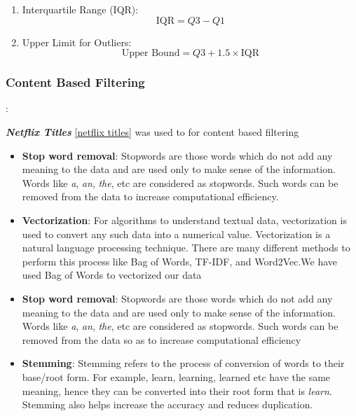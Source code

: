 \documentclass[a4paper,10pt]{article}
\begin{document}
\begin{enumerate}
  \item Interquartile Range (IQR):
    \[ \text{IQR} = Q3 - Q1 \]

  \item Upper Limit for Outliers:
    \[ \text{Upper Bound} = Q3 + 1.5 \times \text{IQR} \]
\end{enumerate}

\subsubsection{Content Based Filtering}:

\textbf{\textit{Netflix Titles}} \ref{netflix titles} was used to for content based filtering

\begin{itemize}
    \item \textbf{Stop word removal}: Stopwords are those words which do not add any meaning to the data and are used only to make sense of the information. Words like \textit{a}, \textit{an}, \textit{the}, etc are considered as stopwords. Such words can be removed from the data to increase computational efficiency. 
\end{itemize}


\begin{itemize}
    \item \textbf{Vectorization}: For algorithms to understand textual data, vectorization is used to convert any such data into a numerical value. Vectorization is a natural language processing technique. There are many different methods to perform this process like Bag of Words, TF-IDF, and Word2Vec.We have used Bag of Words to vectorized our data
\end{itemize}

\begin{itemize}
    \item \textbf{Stop word removal}: Stopwords are those words which do not add any meaning to the data and are used only to make sense of the information. Words like \textit{a}, \textit{an}, \textit{the}, etc are considered as stopwords. Such words can be removed from the data so as to increase computational efficiency
\end{itemize}

\begin{itemize}
    \item \textbf{Stemming}: Stemming refers to the process of conversion of words to their base/root form. For example, learn, learning, learned etc have the same meaning, hence they can be converted into their root form that is \textit{learn}. Stemming also helps increase the accuracy and reduces duplication. 
\end{itemize}
\end{document}
